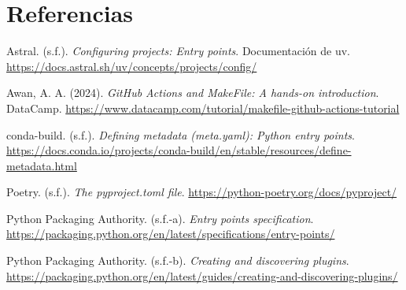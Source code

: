 \documentclass[12pt,a4paper]{article}
\renewcommand{\_}{\guionbajo\allowbreak}
\newenvironment{referencias}
  {\begin{list}{}{%
     \setlength{\leftmargin}{1.6em}\setlength{\itemindent}{-1.6em}%
     \setlength{\labelwidth}{0pt}\setlength{\labelsep}{0pt}%
     \setlength{\itemsep}{0.7em}\setlength{\parsep}{0pt}}}
  {\end{list}}
\begin{document}
\section{Referencias}

\begin{referencias}

\item Astral. (s.f.). \emph{Configuring projects: Entry points}. Documentación de uv.
\url{https://docs.astral.sh/uv/concepts/projects/config/}

\item Awan, A. A. (2024). \emph{GitHub Actions and MakeFile: A hands-on introduction}. DataCamp.
\url{https://www.datacamp.com/tutorial/makefile-github-actions-tutorial}

\item conda-build. (s.f.). \emph{Defining metadata (meta.yaml): Python entry points}.
\url{https://docs.conda.io/projects/conda-build/en/stable/resources/define-metadata.html}

\item Poetry. (s.f.). \emph{The pyproject.toml file}.
\url{https://python-poetry.org/docs/pyproject/}

\item Python Packaging Authority. (s.f.-a). \emph{Entry points specification}.
\url{https://packaging.python.org/en/latest/specifications/entry-points/}

\item Python Packaging Authority. (s.f.-b). \emph{Creating and discovering plugins}.
\url{https://packaging.python.org/en/latest/guides/creating-and-discovering-plugins/}

\end{referencias}
\end{document}
